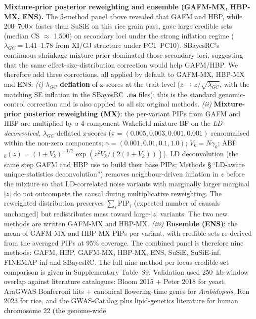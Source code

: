 \textbf{Mixture-prior posterior reweighting and ensemble (GAFM-MX, HBP-MX, ENS).}
The 5-method panel above revealed that GAFM and HBP, while
200--700$\times$ faster than SuSiE on this rice grain pass, gave large
credible sets (median CS $\approx$ 1{,}500) on secondary loci under the
strong inflation regime ($\lambda_{GC}{=}1.41$--$1.78$ from XI/GJ
structure under PC1--PC10). SBayesRC's continuous-shrinkage mixture
prior dominated those secondary loci, suggesting that the same
effect-size-distribution correction would help GAFM/HBP. We therefore
add three corrections, all applied by default to GAFM-MX, HBP-MX and
ENS:
\emph{(i)} \textbf{$\lambda_{GC}$ deflation} of z-scores at the trait
level ($z \to z / \sqrt{\lambda_{GC}}$, with the matching SE inflation in
the SBayesRC \texttt{.ma} files); this is the standard genomic-control
correction and is also applied to all six original methods.
\emph{(ii)} \textbf{Mixture-prior posterior reweighting (MX)}: the
per-variant PIPs from GAFM and HBP are multiplied by a 4-component
Wakefield mixture-BF on the
\emph{LD-deconvolved}, $\lambda_{GC}$-deflated z-scores
($\pi=(0.005, 0.003, 0.001, 0.001)$ renormalised within the non-zero
components; $\gamma=(0.001, 0.01, 0.1, 1.0)$; $V_k = N\gamma_k$;
ABF$_k(z) = (1+V_k)^{-1/2} \exp(z^2 V_k / (2(1+V_k)))$). LD
deconvolution (the same step GAFM and HBP use to build their base
PIPs; Methods \S\,``LD-aware unique-statistics deconvolution'')
removes neighbour-driven inflation in $z$ before the mixture so
that LD-correlated noise variants with marginally larger marginal
$|z|$ do not outcompete the causal during multiplicative
reweighting. The reweighted distribution preserves
$\sum_i \mathrm{PIP}_i$ (expected number of causals unchanged) but
redistributes mass toward large-$|z|$ variants. The two new
methods are written GAFM-MX and HBP-MX.
\emph{(iii)} \textbf{Ensemble (ENS)}: the mean of GAFM-MX and HBP-MX
PIPs per variant, with credible sets re-derived from the averaged PIPs
at 95\% coverage. The combined panel is therefore nine methods:
GAFM, HBP, GAFM-MX, HBP-MX, ENS, SuSiE, SuSiE-inf, FINEMAP-inf
and SBayesRC. The full nine-method per-locus credible-set
comparison is given in Supplementary Table~S9.
Validation used 250~kb-window overlap
against literature catalogues: Bloom 2015\cite{bloom2015genetic} +
Peter 2018\cite{peter2018genome} for yeast,
AraGWAS\cite{togninalli2018aragwas} Bonferroni hits + canonical
flowering-time genes for \emph{Arabidopsis},
Ren 2023\cite{ren2023rice} for rice, and the
GWAS-Catalog\cite{buniello2019nhgri} plus
lipid-genetics literature for human chromosome 22 (the genome-wide
